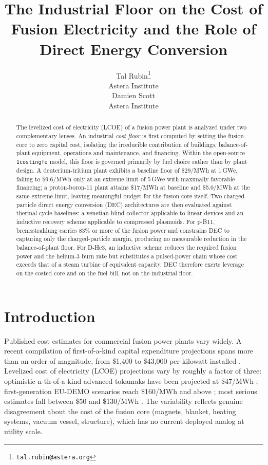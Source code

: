 \documentclass{article}
\title{The Industrial Floor on the Cost of Fusion Electricity and the
Role of Direct Energy Conversion}
\author{%
        Tal Rubin\thanks{\texttt{tal.rubin@astera.org}} \\
        Astera Institute \\
        \And
        Damien Scott \\
        Astera Institute
}
\begin{document}
\maketitle

\begin{abstract}
The levelized cost of electricity (LCOE) of a fusion power plant is
analyzed under two complementary lenses. An industrial \emph{cost
floor} is first computed by setting the fusion core to zero capital
cost, isolating the irreducible contribution of buildings,
balance-of-plant equipment, operations and maintenance, and financing.
Within the open-source \texttt{1costingfe} model, this floor is
governed primarily by fuel choice rather than by plant design. A
deuterium-tritium plant exhibits a baseline floor of \$29/MWh at
1\,GWe, falling to \$9.6/MWh only at an extreme limit of 5\,GWe
with maximally favorable financing; a proton-boron-11 plant
attains \$17/MWh at baseline and \$5.0/MWh at the same extreme
limit, leaving meaningful budget for the fusion core itself. Two
charged-particle direct energy conversion (DEC) architectures are
then evaluated against thermal-cycle baselines: a venetian-blind
collector applicable to linear devices and an inductive recovery
scheme applicable to compressed plasmoids. For p-B11, bremsstrahlung
carries 83\% or more of the fusion power and constrains DEC to capturing only
the charged-particle margin, producing no measurable reduction in the
balance-of-plant floor. For D-He3, an inductive scheme reduces the
required fusion power and the helium-3 burn rate but substitutes a
pulsed-power chain whose cost exceeds that of a steam turbine of
equivalent capacity. DEC therefore exerts leverage on the costed core
and on the fuel bill, not on the industrial floor.
\end{abstract}


\section{Introduction}
\label{sec:intro}

Published cost estimates for commercial fusion power plants vary
widely. A recent compilation of first-of-a-kind capital expenditure
projections spans more than an order of magnitude, from \$1{,}400
to \$43{,}000 per kilowatt installed \citep{Tang2026}. Levelized
cost of electricity (LCOE) projections vary by roughly a factor of
three: optimistic n-th-of-a-kind advanced tokamaks have been
projected at \$47/MWh \citep{Najmabadi2006}; first-generation
EU-DEMO scenarios reach \$160/MWh and above \citep{Entler2018};
most serious estimates fall between \$50 and \$130/MWh
\citep{SheffieldMilora2016, Lindley2023}. The variability reflects genuine
disagreement about the cost of the fusion core (magnets, blanket,
heating systems, vacuum vessel, structure), which has no current
deployed analog at utility scale.
\end{document}

